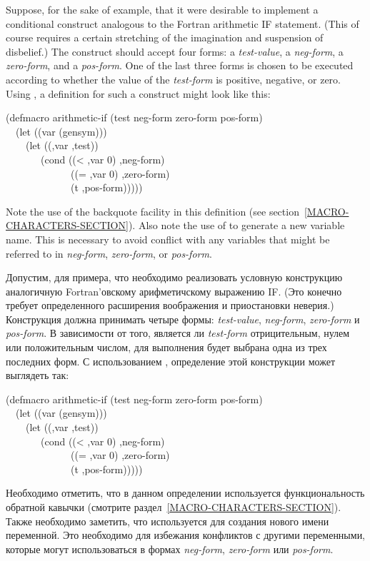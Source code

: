 \begin{defmac}
Suppose, for the sake of example, that it were desirable
to implement a conditional construct analogous to the
Fortran arithmetic IF statement.  (This of course requires a certain
stretching of the imagination and suspension of disbelief.)
The construct should accept four forms: a \emph{test-value},
a \emph{neg-form}, a \emph{zero-form}, and a \emph{pos-form}.
One of the last three forms is chosen to be executed according
to whether the value of the \emph{test-form} is positive, negative,
or zero.
Using , a definition for such a construct
might look like this:
\begin{lisp}
(defmacro arithmetic-if (test neg-form zero-form pos-form) \\
~~(let ((var (gensym))) \\
~~~~{\Xbq}(let ((,var ,test)) \\
~~~~~~~(cond ((< ,var 0) ,neg-form) \\
~~~~~~~~~~~~~((= ,var 0) ,zero-form) \\
~~~~~~~~~~~~~(t ,pos-form)))))
\end{lisp}
Note the use of the backquote facility in this definition
(see section~\ref{MACRO-CHARACTERS-SECTION}).
Also note the use of  to generate a new variable name.
This is necessary to avoid conflict with any variables that might
be referred to in \emph{neg-form}, \emph{zero-form}, or \emph{pos-form}.

Допустим, для примера, что необходимо реализовать условную конструкцию
аналогичную Fortran'овскому арифметичскому выражению IF. (Это конечно требует
определенного расширения воображения и приостановки неверия.)
Конструкция должна принимать четыре формы:
\emph{test-value},
\emph{neg-form},
\emph{zero-form} и
\emph{pos-form}.
В зависимости от того, является ли \emph{test-form} отрицительным, нулем или
положительным числом, для выполнения будет выбрана одна из трех последних форм.
С использованием , определение этой конструкции может выглядеть
так:
\begin{lisp}
(defmacro arithmetic-if (test neg-form zero-form pos-form) \\
~~(let ((var (gensym))) \\
~~~~{\Xbq}(let ((,var ,test)) \\
~~~~~~~(cond ((< ,var 0) ,neg-form) \\
~~~~~~~~~~~~~((= ,var 0) ,zero-form) \\
~~~~~~~~~~~~~(t ,pos-form)))))
\end{lisp}
Необходимо отметить, что в данном определении используется функциональность
обратной кавычки (смотрите раздел~\ref{MACRO-CHARACTERS-SECTION}).
Также необходимо заметить, что используется  для создания нового
имени переменной.
Это необходимо для избежания конфликтов с другими переменными, которые могут
использоваться в формах \emph{neg-form}, \emph{zero-form} или \emph{pos-form}.


\end{defmac}
